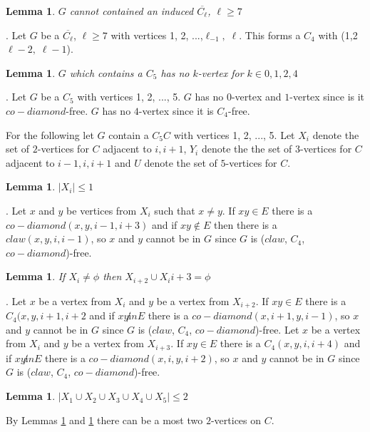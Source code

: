 \documentclass[12pt]{article}
\newtheorem{Lemma}[Theorem]{Lemma}
\def\CCD{($claw$, $C_4$, $co-diamond$)}
\begin{document}
\begin{Lemma}\label{lem:anti-odd-hole-free}
$G$ cannot contained an induced $\overline{C_\ell}$, $\ell \geq 7$
\end{Lemma}
. Let $G$ be a $\overline{C_\ell}$, $\ell \geq 7$ with vertices 1, 2, ...,$\ell_{-1},\; \ell$. This forms a $C_4$ with (1,2 $\ell-2,\; \ell-1$).

\begin{Lemma}\label{lem:c5-k-vertex}
$G$ which contains a $C_5$ has no $k$-vertex for $k \in {0, 1, 2, 4}$
\end{Lemma}
. Let $G$ be a $C_5$ with vertices 1, 2, ..., 5. $G$ has no $0$-vertex and $1$-vertex since is it $co-diamond$-free. $G$ has no $4$-vertex since it is $C_4$-free.

For the following let $G$ contain a $C_5 C$ with vertices 1, 2, ..., 5. Let $X_i$ denote the set of $2$-vertices for $C$ adjacent to $i, i+1$, $Y_i$ denote the the set of $3$-vertices for $C$ adjacent to $i-1, i, i+1$ and $U$ denote the set of $5$-vertices for $C$.

\begin{Lemma}\label{lem:max-2-xi}
$|X_i| \leq 1$
\end{Lemma}
. Let $x$ and $y$ be vertices from $X_i$ such that $x \neq y$. If $xy \in E$ there is a $co-diamond (x, y, i-1, i+3)$ and if $xy \not \in E$ then there is a $claw (x, y, i, i-1)$, so $x$ and $y$ cannot be in $G$ since $G$ is {\CCD}-free.

\begin{Lemma}\label{lem:xi-no-xi2}
If $X_i \neq \phi$ then $X_{i+2} \cup X_i{i+3} = \phi$
\end{Lemma}
. Let $x$ be a vertex from $X_i$ and $y$ be a vertex from $X_{i+2}$. If $xy \in E$ there is a $C_4 (x, y, i+1, i+2$ and if $xy \not in E$ there is a $co-diamond (x,i+1, y, i-1)$, so $x$ and $y$ cannot be in $G$ since $G$ is {\CCD}-free. Let $x$ be a vertex from $X_i$ and $y$ be a vertex from $X_{i+3}$. If $xy \in E$ there is a $C_4 (x, y, i, i+4)$ and if $xy \not in E$ there is a $co-diamond (x,i, y, i+2)$, so $x$ and $y$ cannot be in $G$ since $G$ is {\CCD}-free. 

\begin{Lemma}\label{lem:max-2-2K}
$|X_1 \cup X_2 \cup X_3 \cup X_4 \cup X_5| \leq 2$
\end{Lemma}
 By Lemmas \ref{lem:max-2-xi} and \ref{lem:max-2-2K} there can be a most two $2$-vertices on $C$.
\end{document}
